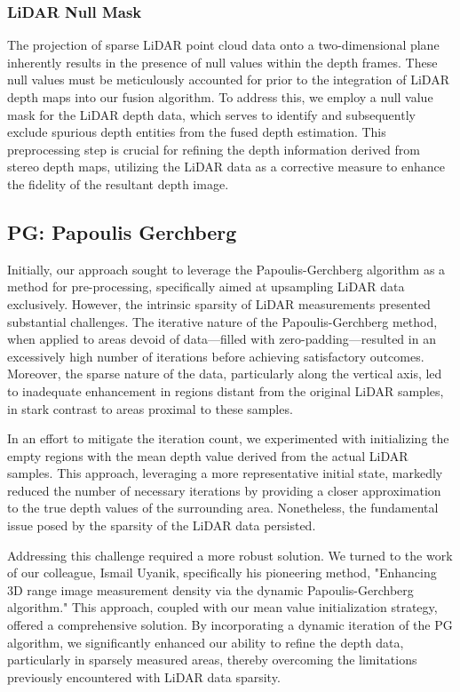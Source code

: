 \documentclass[conference]{IEEEtran}
\begin{document}
\subsubsection{LiDAR Null Mask} \label{lidar-null-mask}

The projection of sparse LiDAR point cloud data onto a two-dimensional plane inherently results in the presence of null values within the depth frames. These null values must be meticulously accounted for prior to the integration of LiDAR depth maps into our fusion algorithm. To address this, we employ a null value mask for the LiDAR depth data, which serves to identify and subsequently exclude spurious depth entities from the fused depth estimation. This preprocessing step is crucial for refining the depth information derived from stereo depth maps, utilizing the LiDAR data as a corrective measure to enhance the fidelity of the resultant depth image.

\subsection{PG: Papoulis Gerchberg}

Initially, our approach sought to leverage the Papoulis-Gerchberg algorithm as a method for pre-processing, specifically aimed at upsampling LiDAR data exclusively. However, the intrinsic sparsity of LiDAR measurements presented substantial challenges. The iterative nature of the Papoulis-Gerchberg method, when applied to areas devoid of data—filled with zero-padding—resulted in an excessively high number of iterations before achieving satisfactory outcomes. Moreover, the sparse nature of the data, particularly along the vertical axis, led to inadequate enhancement in regions distant from the original LiDAR samples, in stark contrast to areas proximal to these samples.

In an effort to mitigate the iteration count, we experimented with initializing the empty regions with the mean depth value derived from the actual LiDAR samples. This approach, leveraging a more representative initial state, markedly reduced the number of necessary iterations by providing a closer approximation to the true depth values of the surrounding area. Nonetheless, the fundamental issue posed by the sparsity of the LiDAR data persisted.

Addressing this challenge required a more robust solution. We turned to the work of our colleague, Ismail Uyanik, specifically his pioneering method, "Enhancing 3D range image measurement density via the dynamic Papoulis-Gerchberg algorithm." This approach, coupled with our mean value initialization strategy, offered a comprehensive solution. By incorporating a dynamic iteration of the PG algorithm, we significantly enhanced our ability to refine the depth data, particularly in sparsely measured areas, thereby overcoming the limitations previously encountered with LiDAR data sparsity.
\end{document}
